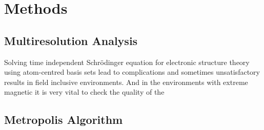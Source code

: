 \section{Methods}

\subsection{Multiresolution Analysis}
Solving time independent Schr\"odinger equation for electronic structure theory using atom-centred basis sets lead to complications and sometimes unsatisfactory results in field inclusive environments.  
And in the environments with extreme magnetic it is very vital to check the quality of the 
\subsection{Metropolis Algorithm}

